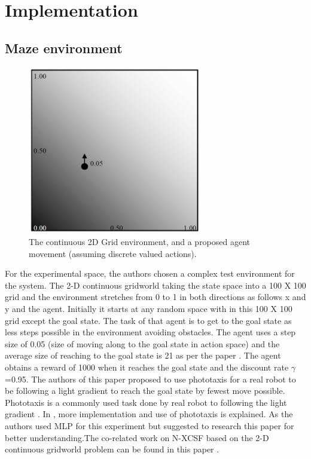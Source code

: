 \documentclass[12pt]{article}
\begin{document}
\section{Implementation}
\label{sec:1}



\subsection{Maze environment}
\label{sec:2}
\begin{figure}[!htbp]
\begin{center}
\includegraphics[width=3in]{fig_1.PNG}
\end{center}
\caption{The continuous 2D Grid environment, and a proposed agent movement (assuming discrete valued actions). \label{fig:first}}
\end{figure}
For the experimental space, the authors chosen a complex test environment for the system. The 2-D continuous gridworld \cite{10.1007/978-3-540-30115-8_44} taking the state space into a 100 X 100 grid and the environment stretches from 0 to 1 in both directions as follows x and y and the agent. Initially it starts at any random space with in this 100 X 100 grid except the goal state. The task of that agent is to get to the goal state as less steps possible in the environment avoiding obstacles. 
The agent uses a step size of 0.05 (size of moving along to the goal state in action space) and the average size of reaching to the goal state is 21 as per the paper \cite{111111111}. The agent obtains a reward of 1000 when it reaches the goal state and the discount rate $\gamma$ =0.95. The authors of this paper proposed to use phototaxis for a real robot to be following a light gradient to reach the goal state by fewest move possible. Phototaxis is a commonly used task done by real robot to following the light gradient \cite{doi:10.1162/artl.2006.12.3.353}. In \cite{doi:10.1162/artl.2006.12.3.353},\cite{10.1007/3-540-45712-7_57} more implementation and use of phototaxis is explained. As the authors used MLP for this experiment but suggested to research this paper for better understanding\cite{1554945}.The co-related work on N-XCSF based on the 2-D continuous gridworld problem can be found in this paper \cite{1554945}. 
\end{document}
